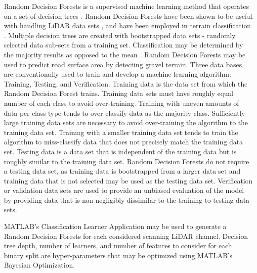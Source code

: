 \documentclass[numbered,pdftex]{ohio-etd}
\begin{document}
{{		{Random Decision Forests is a supervised machine learning method that operates on a set of decision trees \cite{ho_random_1995}. Random Decision Forests have been shown to be useful with handling LiDAR data sets \cite{breiman_random_2001}, and have been employed in terrain classification \cite{laible_3d_2012,laible_map_building,laible_terrain_2013,khan_high_2011,reymann_improving_2015,schilling_geometric_2017, wietrzykowski_context-aware_2019}. Multiple decision trees are created with bootstrapped data sets - randomly selected data sub-sets from a training set. Classification may be determined by the majority results as opposed to the mean \cite{breiman_random_2001,ho_random_1995}. Random Decision Forests may be used to predict road surface area by detecting gravel terrain. Three data bases are conventionally used to train and develop a machine learning algorithm: Training, Testing, and Verification. Training data is the data set from which the Random Decision Forest trains. Training data sets must have roughly equal number of each class to avoid over-training. Training with uneven amounts of data per class type tends to over-classify data as the majority class. Sufficiently large training data sets are necessary to avoid over-training the algorithm to the training data set. Training with a smaller training data set tends to train the algorithm to miss-classify data that does not precisely match the training data set. Testing data is a data set that is independent of the training data but is roughly similar to the training data set. Random Decision Forests do not require a testing data set, as training data is bootstrapped from a larger data set and training data that is not selected may be used as the testing data set. Verification or validation data sets are used to provide an unbiased evaluation of the model by providing data that is non-negligibly dissimilar to the training to testing data sets. } 
		
		{MATLAB's Classification Learner Application may be used to generate a Random Decision Forests for each considered scanning LiDAR channel. Decision tree depth, number of learners, and number of features to consider for each binary split are hyper-parameters that may be optimized using MATLAB's Bayesian Optimization.}
		
}}
\end{document}
